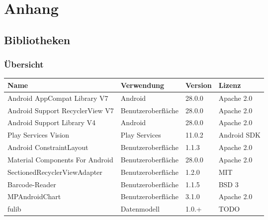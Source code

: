 \section{Anhang}\label{sec:bib}

\subsection{Bibliotheken}\label{subsec:bibliotheken}

\subsubsection{Übersicht}

\begin{tabularx}{\textwidth}{X|l|l|l}
    \textbf{Name} & \textbf{Verwendung} & \textbf{Version} & \textbf{Lizenz} \\
    \hline
    Android AppCompat Library V7 & Android & 28.0.0 & Apache 2.0\\    %
    Android Support RecyclerView V7 & Benutzeroberfläche & 28.0.0 & Apache 2.0\\      %
    Android Support Library V4 & Android & 28.0.0 & Apache 2.0\\   %

    Play Services Vision & Play Services & 11.0.2 & Android SDK\\  %

    Android ConstraintLayout & Benutzeroberfläche & 1.1.3 & Apache 2.0\\   %
    Material Components For Android & Benutzeroberfläche & 28.0.0 & Apache 2.0\\  %
    SectionedRecyclerViewAdapter & Benutzeroberfläche & 1.2.0 & MIT\\   %
    Barcode-Reader & Benutzeroberfläche & 1.1.5 & BSD 3\\   %
    MPAndroidChart & Benutzeroberfläche & 3.1.0 & Apache 2.0\\  %

    fulib & Datenmodell & 1.0.+ & TODO\\    %


\end{tabularx}
